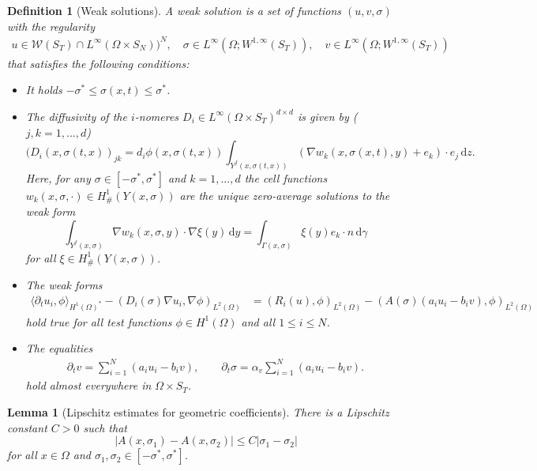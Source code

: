 \documentclass[10pt,a4paper]{amsart}
\newtheorem{defn}{Definition}
\newtheorem{lem}{Lemma}
\newcommand{\di}[1]{\,\mathrm{d}#1}
\begin{document}
\begin{defn}[Weak solutions]\label{def:weak_solution}
A weak solution is a set of functions $(u,v,\sigma)$ with the regularity
%
\begin{align*}
u\in \mathcal{W}(S_T)\cap L^\infty(\Omega\times S_N))^N,\quad \sigma\in L^\infty(\Omega;W^{1,\infty}(S_T)),\quad
v\in L^\infty(\Omega;W^{1,\infty}(S_T))
\end{align*}
that satisfies the following conditions:
\begin{itemize}
    \item[$(i)$] It holds $-\sigma^*\le\sigma(x,t)\le\sigma^*$.
    \item[$(ii)$] The diffusivity of the $i$-nomeres $D_i\in L^\infty(\Omega\times S_T)^{d\times d}$ is given by ($j,k=1,...,d$)
    \[
    (D_i(x,\sigma(t,x))_{jk}=d_i\phi(x,\sigma(t,x))\int_{Y^f(x,\sigma(t,x))}(\nabla w_{k}(x,\sigma(x,t),y)+e_{k})\cdot e_j\di{z}.
    \]
    Here, for any $\sigma\in[-\sigma^*,\sigma^*]$ and $k=1,...,d$ the cell functions $w_{k}(x,\sigma,\cdot)\in H^1_\#(Y(x,\sigma))$ are the unique zero-average solutions to the weak form
    \[
    \int_{Y^f(x,\sigma)}\nabla w_k(x,\sigma,y)\cdot\nabla\xi(y)\di{y}=\int_{\Gamma(x,\sigma)}\xi(y)e_k\cdot n\di{\gamma}
    \]
    for all $\xi\in H^1_\#(Y(x,\sigma))$.
    \item[$(iii)$] The weak forms
    \begin{align*}
    \langle\partial_t u_i,\phi\rangle_{H^1(\Omega)^*}-(D_i(\sigma)\nabla u_i,\nabla\phi)_{L^2(\Omega)} &=(R_i(u),\phi)_{L^2(\Omega)}-(A(\sigma)(a_iu_i- b_iv),\phi)_{L^2(\Omega)}
    \end{align*}
    hold true for all test functions $\phi\in H^1(\Omega)$ and all $1\leq i\leq N$.
    \item[$(iv)$] The equalities
    \begin{align*}
     \partial_tv=\sum_{i=1}^N(a_iu_i- b_iv),\qquad
     \partial_t\sigma=\alpha_v\sum_{i=1}^N(a_iu_i- b_iv).
    \end{align*}
    hold almost everywhere in $\Omega\times S_T$.
\end{itemize}
%
\end{defn}

\begin{lem}[Lipschitz estimates for geometric coefficients]\label{lemma:lipschitz_coefficient}
    There is a Lipschitz constant $C>0$ such that
    \[
    |A(x,\sigma_1)-A(x,\sigma_2)|\leq C|\sigma_1-\sigma_2|
    \]
    for all $x\in\Omega$ and $\sigma_1,\sigma_2\in[-\sigma^*,\sigma^*]$.
\end{lem}
\end{document}
